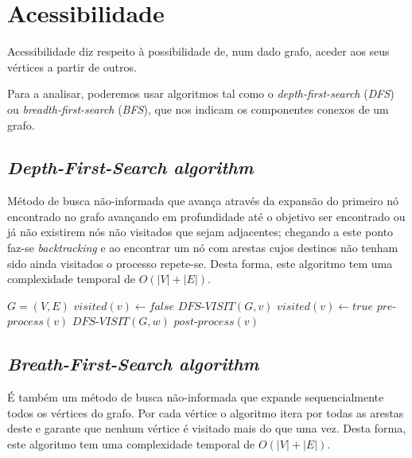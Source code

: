 \documentclass[12pt,a4paper]{report}
\begin{document}
	\section{Acessibilidade}
	\label{perspetivas:acessibilidade}
	Acessibilidade diz respeito à possibilidade de, num dado grafo, aceder aos seus vértices a partir de outros. \par
	Para a analisar, poderemos usar algoritmos tal como o \textit{depth-first-search} (\textit{DFS}) ou \textit{breadth-first-search} (\textit{BFS}), que nos indicam os componentes conexos de um grafo.

		\subsection{\textit{Depth-First-Search algorithm}}
		\label{algo:dfs}
		Método de busca não-informada que avança através da expansão do primeiro nó encontrado no grafo avançando em profundidade até o objetivo ser encontrado ou já não existirem nós não visitados que sejam adjacentes; chegando a este ponto faz-se \textit{backtracking} e ao encontrar um nó com arestas cujos destinos não tenham sido ainda visitados o processo repete-se. Desta forma, este algoritmo tem uma complexidade temporal de \( O(|V| + |E|) \).

		\begin{center}
			\begin{algorithmic}[1]
				\State $G = (V, E)$
				\newline
						\State $ visited(v) \leftarrow false $
					\EndFor
								\State $DFS$-$VISIT(G, v)$
						\EndIf
					\EndFor
				\EndFunction
				\newline
					\State $ visited(v) \leftarrow true $
					\State $ pre$-$process(v) $
							\State $DFS$-$VISIT(G, w)$
						\EndIf
					\EndFor
					\State $post$-$process(v)$
				\EndFunction
			\end{algorithmic}
		\end{center}

		\subsection{\textit{Breath-First-Search algorithm}}
		\label{algo:bfs}
		É também um método de busca não-informada que expande sequencialmente todos os vértices do grafo. Por cada vértice o algoritmo itera por todas as arestas deste e garante que nenhum vértice é visitado mais do que uma vez. Desta forma, este algoritmo tem uma complexidade temporal de \( O(|V| + |E|)\).
\end{document}
